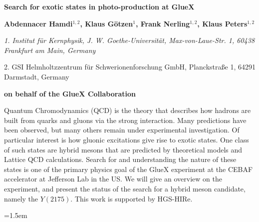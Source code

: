\documentclass{article}
\begin{document}
\begin{center}
{\Large\bfseries Search for exotic states in photo-production at GlueX\par}
\vspace{3ex}
{\bfseries Abdennacer Hamdi$^{1,2}$, Klaus Götzen$^{1}$, Frank Nerling$^{1,2}$, Klaus Peters$^{1,2}$ \par}
{\footnotesize\itshape
1. Institut für Kernphysik, J. W. Goethe-Universität, Max-von-Laue-Str. 1, 60438 Frankfurt am Main, Germany \par
2. GSI Helmholtzzentrum für Schwerionenforschung GmbH, Planckstraße 1, 64291 Darmstadt, Germany \par}
\vspace{1ex}
{\bfseries on behalf of the GlueX Collaboration \par}

\vspace{3ex}
\end{center}
Quantum Chromodynamics (QCD) is the theory that describes how hadrons are built from quarks and gluons via the strong 
interaction. Many predictions have been observed, but many others remain under experimental 
investigation.
Of particular interest is how gluonic excitations give rise to exotic states. One class of such states are hybrid
mesons that are predicted by theoretical models and Lattice QCD calculations.
Search for and understanding the nature of these states is one of the primary physics goal of the GlueX experiment at the CEBAF accelerator at Jefferson Lab in the US.
We will give an overview on the experiment, and present the status of the search for a hybrid meson candidate, namely the $Y(2175)$.
This work is supported by HGS-HIRe.

\setlength\parindent{0pt}\vspace{2ex}

\footnotesize


\hangindent=1.5em


\end{document}
